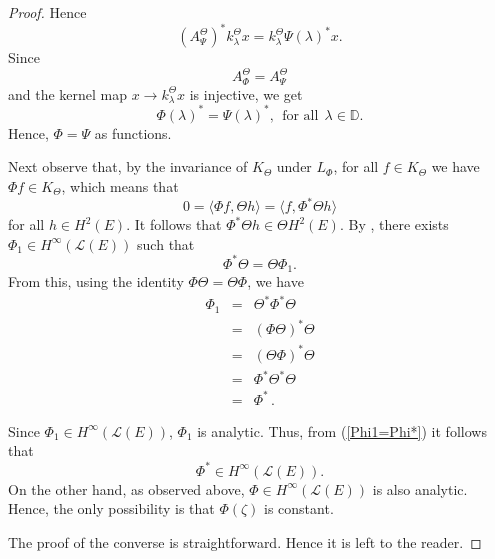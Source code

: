 \documentclass{amsart}
\theoremstyle{definition}
\newtheorem{cor}[thm]{Corollary}
\newcommand{\h}{\mathcal{\mathcal H}}
\def\nn{\nonumber}
\begin{document}
\begin{proof}
Hence
$$(A_{\Psi}^{\Theta})^{*}k_{\lambda}^{\Theta}x=k_{\lambda}^{\Theta}\Psi(\lambda)^{*}x.$$ Since $$A_{\Phi}^{\Theta}=A_{\Psi}^{\Theta}$$ and the kernel map $x\to k_{\lambda}^{\Theta}x$ is injective, we get 
$$\Phi(\lambda)^{*}=\Psi(\lambda)^{*}, ~~\text{for all}~~\lambda\in \mathbb{D}.$$ Hence, $\Phi=\Psi$ as functions.

Next observe that, by the invariance of $ K_{\Theta}$ under $L_{\Phi}$,  for all $f\in K_{\Theta}$ we have $\Phi f\in K_{\Theta}$, which means that
$$0=\langle \Phi f, \Theta h \rangle=\langle f, \Phi^{*}\Theta h\rangle $$ for all $h\in H^{2}(E)$. It follows that $\Phi^{*}\Theta h\in \Theta H^{2}(E)$. By \cite[Lemma 2.2]{RT}, there exists $\Phi_{1}\in H^{\infty}(\mathcal{L}(E))$ such that $$\Phi^{*}\Theta=\Theta \Phi_{1}.$$
From this, using the identity $\Phi\Theta=\Theta\Phi$, we have
\begin{eqnarray} \Phi_{1}&=&\Theta^{*}\Phi^{*}\Theta\nn\\
&=&(\Phi\Theta)^{*}\Theta\nn\\
&=&(\Theta\Phi)^{*}\Theta\nn\\
&=&\Phi^{*}\Theta^{*}\Theta\nn\\
&=& \Phi^{*}\,.\label{Phi1=Phi*}\end{eqnarray}

\noindent Since $\Phi_{1}\in H^{\infty}(\mathcal{L}(E))$, $\Phi_{1}$ is analytic. Thus, from (\ref{Phi1=Phi*}) it follows that
$$\Phi^{*}\in H^{\infty}(\mathcal{L}(E)).$$
On the other hand, as observed above, $\Phi\in H^{\infty}(\mathcal{L}(E))$ is also analytic.  Hence, the only possibility is that $\Phi(\zeta)$ is constant.

The proof of the converse is straightforward. Hence it is left to the reader.
\end{proof}


\end{document}

